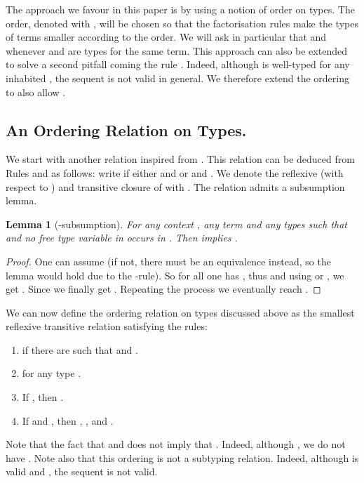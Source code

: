 \documentclass[colorlinks=true,linkcolor=black,urlcolor=black,citecolor=blue,submission,copyright,creativecommons]{eptcs}
\newtheorem{lemma}[theorem]{Lemma}
\begin{document}
The approach we favour in this paper is by using a notion of order on
types. The order, denoted with , will be chosen so that
the factorisation rules make the
types of terms smaller according to the order. We will ask in
particular that  and  whenever  and  are types for the same
term. 
This approach can also be extended to solve a second pitfall coming the
rule . Indeed, although  is well-typed for any inhabited , the sequent
 is not valid in general. We therefore extend
the ordering to also allow .


\subsection{An Ordering Relation on Types.}

We start with another relation  inspired from
\cite{Barendregt92}. This relation can be deduced from Rules
 and  as follows: write  if either
 and  or  and
. We denote the reflexive
(with respect to ) and transitive closure of  with .
The relation  admits a subsumption lemma.

\begin{lemma}[-subsumption]\label{lem:subsumption}
  For any context , any term  and any types  such that  and no free type variable in  occurs in . Then 
   implies .
\end{lemma}
\begin{proof}
 One can assume  (if not, there must be an equivalence
 instead, so the lemma would hold due to the -rule). So
 for all  one has , thus
  and using
  or , we get . Since  we finally get . Repeating the process we eventually reach .
\end{proof}


We can now define the ordering relation  on types
discussed above as the
smallest reflexive transitive relation satisfying the rules:
\begin{enumerate}
 \item 
   if there are  such that  and .
\item  for any type .
\item If , then .
\item If  and , then ,  ,  and .
\end{enumerate}
Note that the fact that  and  does not imply that . Indeed, although , we do not have .
Note also that this ordering is not a subtyping relation. Indeed,
although  is valid and
, the
sequent  is not valid.
\end{document}
